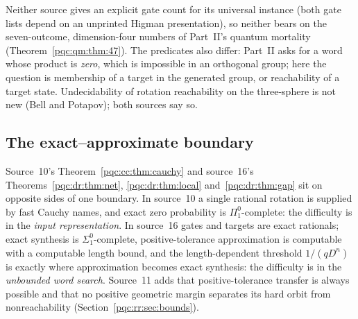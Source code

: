 \documentclass[11pt,letterpaper]{article}
\numberwithin{equation}{section}
\theoremstyle{definition}
\theoremstyle{remark}
\newcommand{\sigone}{\Sigma^0_1}
\newcommand{\pione}{\Pi^0_1}
\begin{document}
Neither source gives an explicit gate count for its universal instance (both
gate lists depend on an unprinted Higman presentation), so neither bears on the
seven-outcome, dimension-four numbers of Part~II's quantum mortality
(Theorem~\ref{pqc:qm:thm:47}). The predicates also differ: Part~II asks for a
word whose product is \emph{zero}, which is impossible in an orthogonal group;
here the question is membership of a target in the generated group, or
reachability of a target state. Undecidability of rotation reachability on the
three-sphere is not new (Bell and Potapov); both sources say so.

\subsection{The exact--approximate boundary}
\label{pqc:conv:b62-VI:boundary}
Source~10's Theorem~\ref{pqc:cc:thm:cauchy} and source~16's
Theorems~\ref{pqc:dr:thm:net}, \ref{pqc:dr:thm:local} and~\ref{pqc:dr:thm:gap}
sit on opposite sides of one boundary. In source~10 a single rational rotation
is supplied by fast Cauchy names, and exact zero probability is
$\pione$-complete: the difficulty is in the \emph{input representation}. In
source~16 gates and targets are exact rationals; exact synthesis is
$\sigone$-complete, positive-tolerance approximation is computable with a
computable length bound, and the length-dependent threshold $1/(qD^n)$ is exactly
where approximation becomes exact synthesis: the difficulty is in the
\emph{unbounded word search}. Source~11 adds that positive-tolerance transfer is
always possible and that no positive geometric margin separates its hard orbit
from nonreachability (Section~\ref{pqc:rr:sec:bounds}).
\end{document}
